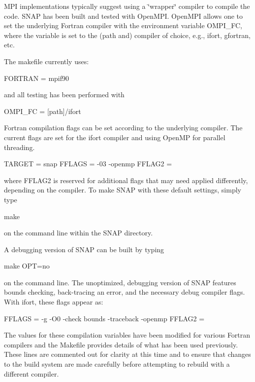 M\-P\-I implementations typically suggest using a \char`\"{}wrapper\char`\"{} compiler to compile the code. S\-N\-A\-P has been built and tested with Open\-M\-P\-I. Open\-M\-P\-I allows one to set the underlying Fortran compiler with the environment variable O\-M\-P\-I\-\_\-\-F\-C, where the variable is set to the (path and) compiler of choice, e.\-g., ifort, gfortran, etc.

The makefile currently uses\-: \begin{DoxyVerb}FORTRAN = mpif90
\end{DoxyVerb}


and all testing has been performed with \begin{DoxyVerb}OMPI_FC = [path]/ifort
\end{DoxyVerb}


Fortran compilation flags can be set according to the underlying compiler. The current flags are set for the ifort compiler and using Open\-M\-P for parallel threading. \begin{DoxyVerb}TARGET = snap
FFLAGS = -03 -openmp
FFLAG2 =
\end{DoxyVerb}


where {\ttfamily F\-F\-L\-A\-G2} is reserved for additional flags that may need applied differently, depending on the compiler. To make S\-N\-A\-P with these default settings, simply type \begin{DoxyVerb}make
\end{DoxyVerb}


on the command line within the S\-N\-A\-P directory.

A debugging version of S\-N\-A\-P can be built by typing \begin{DoxyVerb}make OPT=no
\end{DoxyVerb}


on the command line. The unoptimized, debugging version of S\-N\-A\-P features bounds checking, back-\/tracing an error, and the necessary debug compiler flags. With ifort, these flags appear as\-: \begin{DoxyVerb}FFLAGS = -g -O0 -check bounds -traceback -openmp
FFLAG2 =
\end{DoxyVerb}


The values for these compilation variables have been modified for various Fortran compilers and the Makefile provides details of what has been used previously. These lines are commented out for clarity at this time and to ensure that changes to the build system are made carefully before attempting to rebuild with a different compiler.

